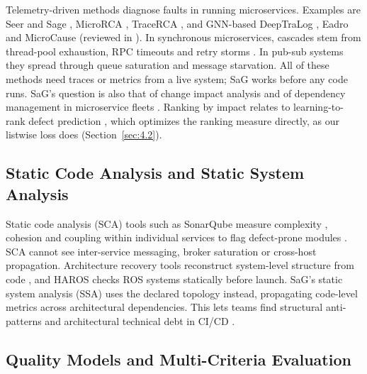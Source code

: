 \documentclass[preprint,3p]{elsarticle}
\begin{document}
Telemetry-driven methods diagnose faults in running microservices. Examples are Seer \cite{gan2019seer} and Sage \cite{gan2021sage}, MicroRCA \cite{wu2020microrca}, TraceRCA \cite{li2021tracerca}, and GNN-based DeepTraLog \cite{zhang2022deeptralog}, Eadro \cite{lee2023eadro} and MicroCause \cite{meng2020microcause} (reviewed in \cite{zhang2024failurediag}). In synchronous microservices, cascades stem from thread-pool exhaustion, RPC timeouts and retry storms \cite{zhou2021fault}. In pub-sub systems they spread through queue saturation and message starvation. All of these methods need traces or metrics from a live system; SaG works before any code runs. SaG's question is also that of change impact analysis \cite{bohner1996impact} and of dependency management in microservice fleets \cite{esparrachiari2018tracking}. Ranking by impact relates to learning-to-rank defect prediction \cite{yang2015ltr}, which optimizes the ranking measure directly, as our listwise loss does (Section~\ref{sec:4.2}).

\subsection{Static Code Analysis and Static System Analysis}
\label{sec:2.2}

Static code analysis (SCA) tools such as SonarQube \cite{sonarsource2024clean} measure complexity \cite{mccabe1976complexity}, cohesion and coupling \cite{chidamber1994metrics,fenton2014metrics} within individual services to flag defect-prone modules \cite{basili1996validation,nagappan2005static,zimmermann2007predicting,menzies2007data}. SCA cannot see inter-service messaging, broker saturation or cross-host propagation. Architecture recovery tools reconstruct system-level structure from code \cite{bushong2021static,schneider2024comparison}, and HAROS \cite{santos2019haros} checks ROS systems statically before launch. SaG's static system analysis (SSA) uses the declared topology instead, propagating code-level metrics across architectural dependencies. This lets teams find structural anti-patterns \cite{garcia2009catalogue,taibi2018microservice} and architectural technical debt \cite{li2015technicaldebt} in CI/CD \cite{humble2010continuous,chen2015continuous}.

\subsection{Quality Models and Multi-Criteria Evaluation}
\label{sec:2.3}
\end{document}
